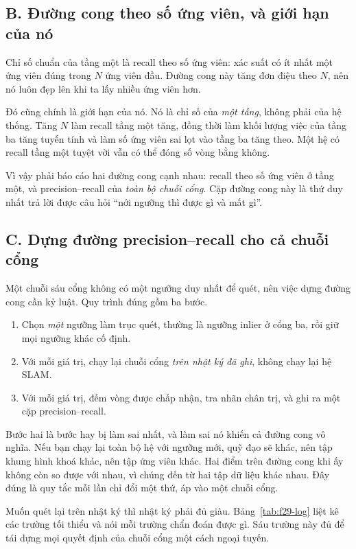 \documentclass[../../deep_learning.tex]{subfiles}
\begin{document}
\subsection{B. Đường cong theo số ứng viên, và giới hạn của nó}
Chỉ số chuẩn của tầng một là recall theo số ứng viên: xác suất có ít nhất một ứng viên đúng trong \(N\) ứng viên đầu. Đường cong này tăng đơn điệu theo \(N\), nên nó luôn đẹp lên khi ta lấy nhiều ứng viên hơn.

Đó cũng chính là giới hạn của nó. Nó là chỉ số của \emph{một tầng}, không phải của hệ thống. Tăng \(N\) làm recall tầng một tăng, đồng thời làm khối lượng việc của tầng ba tăng tuyến tính và làm số ứng viên sai lọt vào tầng ba tăng theo. Một hệ có recall tầng một tuyệt vời vẫn có thể đóng số vòng bằng không.

Vì vậy phải báo cáo hai đường cong cạnh nhau: recall theo số ứng viên ở tầng một, và precision--recall của \emph{toàn bộ chuỗi cổng}. Cặp đường cong này là thứ duy nhất trả lời được câu hỏi ``nới ngưỡng thì được gì và mất gì''.

\subsection{C. Dựng đường precision--recall cho cả chuỗi cổng}
Một chuỗi sáu cổng không có một ngưỡng duy nhất để quét, nên việc dựng đường cong cần kỷ luật. Quy trình đúng gồm ba bước.

\begin{enumerate}
\item Chọn \emph{một} ngưỡng làm trục quét, thường là ngưỡng inlier ở cổng ba, rồi giữ mọi ngưỡng khác cố định.
\item Với mỗi giá trị, chạy lại chuỗi cổng \emph{trên nhật ký đã ghi}, không chạy lại hệ SLAM.
\item Với mỗi giá trị, đếm vòng được chấp nhận, tra nhãn chân trị, và ghi ra một cặp precision--recall.
\end{enumerate}

Bước hai là bước hay bị làm sai nhất, và làm sai nó khiến cả đường cong vô nghĩa. Nếu bạn chạy lại toàn bộ hệ với ngưỡng mới, quỹ đạo sẽ khác, nên tập khung hình khoá khác, nên tập ứng viên khác. Hai điểm trên đường cong khi ấy không còn so được với nhau, vì chúng đến từ hai tập dữ liệu khác nhau. Đây đúng là quy tắc mỗi lần chỉ đổi một thứ, áp vào một chuỗi cổng.

Muốn quét lại trên nhật ký thì nhật ký phải đủ giàu. Bảng~\ref{tab:f29-log} liệt kê các trường tối thiểu và nói mỗi trường chẩn đoán được gì. Sáu trường này đủ để tái dựng mọi quyết định của chuỗi cổng một cách ngoại tuyến.
\end{document}
